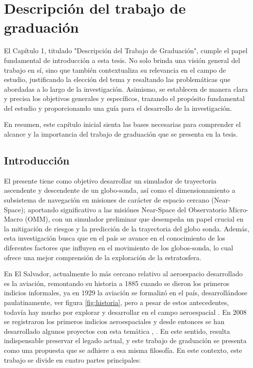 \chapter{Descripción del trabajo de graduación} \label{chp:01_intro}

\vspace{0.2cm}

El Capítulo 1, titulado "Descripción del Trabajo de Graduación", cumple el papel fundamental de introducción a esta tesis. No solo brinda una visión general del trabajo en sí, sino que también contextualiza su relevancia en el campo de estudio, justificando la elección del tema y resaltando las problemáticas que abordadas a lo largo de la investigación. Asimismo, se establecen de manera clara y precisa los objetivos generales y específicos, trazando el propósito fundamental del estudio y proporcionando una guía para el desarrollo de la investigación. 

\vspace{0.5cm}

En resumen, este capítulo inicial sienta las bases necesarias para comprender el alcance y la importancia del trabajo de graduación que se presenta en la tesis.


\newpage

\section{Introducción} \label{sct:intro:introducción}

El presente tiene como objetivo desarrollar un simulador de trayectoria ascendente y descendente de un globo-sonda, así como el dimensionamiento a subsistema de navegación en misiones de carácter de espacio cercano (Near-Space); aportando significativo a las misiónes Near-Space del Observatorio Micro-Macro (OMM), con un simulador preliminar que desempeña un papel crucial en la mitigación de riesgos y la predicción  de la trayectoria del globo sonda. Además,  esta investigación busca que en el país se avance en el conocimiento de los diferentes factores que influyen en el movimiento de los globos-sonda, lo cual ofrece una mejor comprensión de la exploración de la estratosfera.

En El Salvador,  actualmente lo más cercano relativo al aeroespacio desarrollado es la aviación, remontando su historia a 1885 cuando se dieron los primeros indicios informales, ya en 1929 la aviación se formalizó en el país,  desarrollándose paulatinamente, ver figura \ref{fig:historia}, pero a pesar de estos antecedentes, todavía hay mucho por explorar y desarrollar en el campo aeroespacial \cite{HistoriaACC}. En 2008 se registraron los primeros indicios aeroespaciales y desde entonces se han desarrollado algunos proyectos con esta temática \cite{HistoriaESAI}, \cite{elfaroColibriytorogoz}. En este sentido, resulta indispensable preservar el legado actual, y este trabajo de graduación se presenta como una propuesta que se adhiere a esa misma filosofía. En este contexto, este trabajo se divide en cuatro partes principales: 

